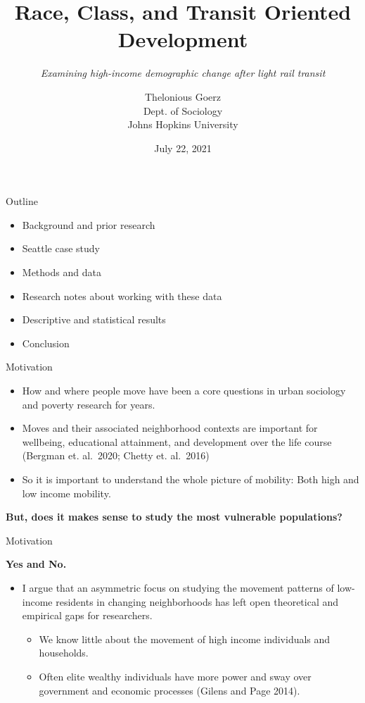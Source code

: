 \documentclass[11pt,ignorenonframetext,]{beamer}
\title{Race, Class, and Transit Oriented Development}
\subtitle{\emph{Examining high-income demographic change after light rail transit}}
\author{Thelonious Goerz\\
Dept. of Sociology\\
Johns Hopkins University}
\institute{PHI Applied Research Fellowship\\
Center for Studies in Demography and Ecology}
\date{July 22, 2021}
\providecommand{\tightlist}{%
  \setlength{\itemsep}{0pt}\setlength{\parskip}{0pt}}
\begin{document}
\frame{\titlepage}

\begin{frame}{Outline}
\protect\hypertarget{outline}{}

\begin{itemize}
\tightlist
\item
  Background and prior research
\item
  Seattle case study
\item
  Methods and data
\item
  Research notes about working with these data
\item
  Descriptive and statistical results
\item
  Conclusion
\end{itemize}

\end{frame}

\begin{frame}{Motivation}
\protect\hypertarget{motivation}{}

\begin{itemize}
\tightlist
\item
  How and where people move have been a core questions in urban
  sociology and poverty research for years.
\item
  Moves and their associated neighborhood contexts are important for
  wellbeing, educational attainment, and development over the life
  course (Bergman et. al.~2020; Chetty et. al.~2016)
\item
  So it is important to understand the whole picture of mobility: Both
  high and low income mobility.
\end{itemize}

\textbf{But, does it makes sense to study the most vulnerable
populations?}

\end{frame}

\begin{frame}{Motivation}
\protect\hypertarget{motivation-1}{}

\textbf{Yes and No.}

\begin{itemize}
\tightlist
\item
  I argue that an asymmetric focus on studying the movement patterns of
  low-income residents in changing neighborhoods has left open
  theoretical and empirical gaps for researchers.

  \begin{itemize}
  \tightlist
  \item
    We know little about the movement of high income individuals and
    households.
  \item
    Often elite wealthy individuals have more power and sway over
    government and economic processes (Gilens and Page 2014).
  \end{itemize}
\end{itemize}

\end{frame}
\end{document}
